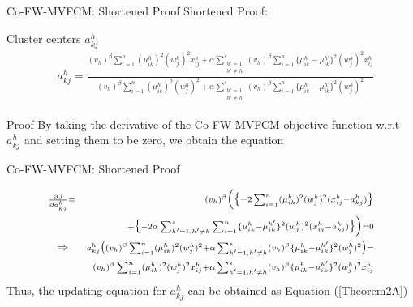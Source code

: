 \documentclass[compress,sky blue]{beamer}
\begin{document}
\begin{frame}{Co-FW-MVFCM: Shortened Proof}
\vspace{-0.6cm}
Shortened Proof:
\begin{exampleblock}{Cluster centers $a_{kj}^{h}$}
\begin{eqnarray*}
   &\scriptstyle a_{kj}^{h} = \frac { (v_{h})^{\beta}\sum_{i=1}^{n}(\mu_{ik}^{h})^{2} (w_{j}^{h})^{2} x_{ij}^{h}+ \alpha \sum_{\substack{h'= 1\\ h'\ne h}}^{s}  (v_{h})^{\beta} \sum_{i=1}^{n} \{ \mu_{ik}^{h}-\mu_{ik}^{h'} \}^{2} (w_{j}^{h})^{2} x_{ij}^{h} }   { (v_{h})^{\beta}\sum_{i=1}^{n}(\mu_{ik}^{h})^{2} (w_{j}^{h})^{2} + \alpha \sum_{\substack{h'= 1\\ h'\ne h}}^{s} (v_{h})^{\beta} \sum_{i=1}^{n} \{ \mu_{ik}^{h}-\mu_{ik}^{h'} \}^{2} (w_{j}^{h})^{2}  }
   \label{UpdatingA1} 
\end{eqnarray*}
\end{exampleblock}
\underline{Proof} By taking the derivative of the Co-FW-MVFCM objective function  w.r.t $a_{kj}^{h}$  and setting them to be zero, we obtain the equation


\end{frame}


\begin{frame}{Co-FW-MVFCM: Shortened Proof}
\vspace{-0.6cm}

\begin{eqnarray*}
 \scriptstyle \frac{\partial J}{\partial a_{kj}^{h}} &\scriptstyle =&\scriptstyle  (v_{h})^{\beta}\Big(\big\{ -2 \sum_{i=1}^{n} (\mu_{ik}^{h})^{2} (w_{j}^{h})^{2} (x_{ij}^{h}-a_{kj}^{h}) \big \} \\
 \scriptstyle && {} \scriptstyle + \big\{ -2 \alpha \sum_{h'=1,h'\neq h}^{s} \sum_{i=1}^{n}\{ \mu_{ik}^{h}-\mu_{ik}^{h'} \}^{2} (w_{j}^{h})^{2} (x_{ij}^{h}-a_{kj}^{h})\big \}\Big)=0\\
\Rightarrow \scriptstyle &&\scriptstyle a_{kj}^{h} \big( (v_{h})^{\beta} \sum_{i=1}^{n} (\mu_{ik}^{h})^{2} (w_{j}^{h})^{2} + \alpha \sum_{h'=1,h'\neq h}^{s} (v_{h})^{\beta} \{ \mu_{ik}^{h}-\mu_{ik}^{h'} \}^{2} (w_{j}^{h})^{2} \big) =\\
 &&  {} \scriptstyle (v_{h})^{\beta} \sum_{i=1}^{n} (\mu_{ik}^{h})^{2} (w_{j}^{h})^{2} x_{ij}^{h}+ \alpha \sum_{h'=1,h'\neq h}^{s} (v_{h})^{\beta} \{ \mu_{ik}^{h}-\mu_{ik}^{h'} \}^{2} (w_{j}^{h})^{2} x_{ij}^{h}
\end{eqnarray*}
Thus, the updating equation for $a_{kj}^{h}$ can be obtained as Equation (\ref{Theorem2A}) 


\end{frame}
\end{document}
